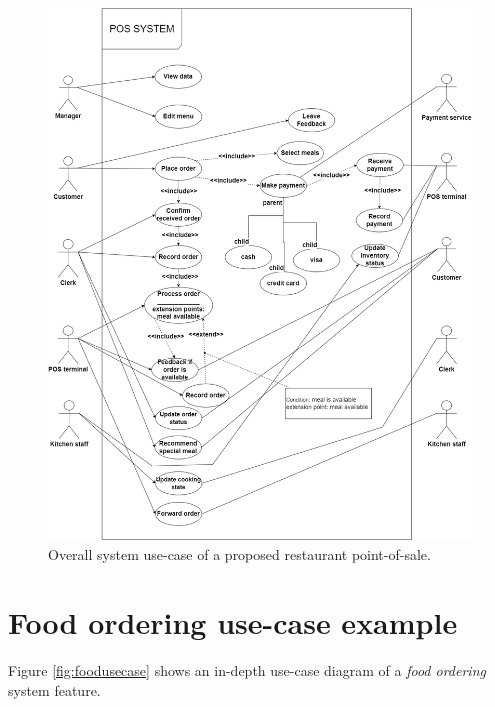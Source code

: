 \documentclass[12pt, a4paper]{article}
\theoremstyle{styleth}
\theoremstyle{styledef}
\begin{document}
\begin{figure}[H]
	\centering
	\includegraphics[width=15.5cm]{259243473_617353449353167_471014773977634987_n.png}
	\caption{Overall system use-case of a proposed restaurant point-of-sale.}
	\label{fig:systemusecase}
\end{figure}

\newpage
\section{Food ordering use-case example}
Figure \ref{fig:foodusecase} shows an in-depth use-case diagram of a \textit{food ordering} system feature.
\end{document}
